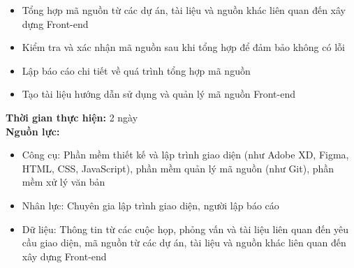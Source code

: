 {\begin{minipage}{\textwidth}
    \begin{itemize}
        \item Tổng hợp mã nguồn từ các dự án, tài liệu và nguồn khác liên quan đến xây dựng Front-end
        \item Kiểm tra và xác nhận mã nguồn sau khi tổng hợp để đảm bảo không có lỗi
        \item Lập báo cáo chi tiết về quá trình tổng hợp mã nguồn
        \item Tạo tài liệu hướng dẫn sử dụng và quản lý mã nguồn Front-end
    \end{itemize}
    \noindent \textbf{Thời gian thực hiện:} 2 ngày \\
    \noindent \textbf{Nguồn lực:}
    \begin{itemize}
        \item Công cụ: Phần mềm thiết kế và lập trình giao diện (như Adobe XD, Figma, HTML, CSS, JavaScript), phần mềm quản lý mã nguồn (như Git), phần mềm xử lý văn bản
        \item Nhân lực: Chuyên gia lập trình giao diện, người lập báo cáo
        \item Dữ liệu: Thông tin từ các cuộc họp, phỏng vấn và tài liệu liên quan đến yêu cầu giao diện, mã nguồn từ các dự án, tài liệu và nguồn khác liên quan đến xây dựng Front-end
    \end{itemize}
    \end{minipage}
}
\newpage
{}    
